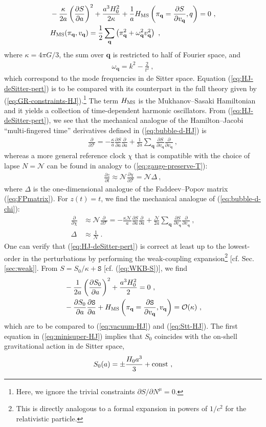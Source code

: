 \documentclass[12pt]{iopart}
\def\eq#1{\begin{equation}\begin{aligned}#1\end{aligned}\end{equation}}
\def\eref#1{(\ref{eq:#1})}
\def\del#1#2{\frac{\partial#1}{\partial#2}}
\def\S{\mathtt{S}}
\def\Ob{\mathcal{O}}
\def\N{\mathcal{N}}
\def\q{\mathbf{q}}
\def\T{\mathcal{T}}
\begin{document}
\eq{\label{eq:HJ-deSitter-pert}
& -\frac{\kappa}{2a}\left(\del{S}{a}\right)^2+\frac{a^3H_0^2}{2\kappa}+\frac{1}{a}H_{\rm MS}\left(\pi_{\q}=\del{S}{v_{\q}},q\right) = 0 \ , \\
&H_{\rm MS}(\pi_{\q},v_{\q}) = \frac12\sum_{\q}\left(\pi_{\q}^2+\omega_{\q}^2v_{\q}^2\right) \ ,
}
where $\kappa = 4\pi G / 3$, the sum over $\q$ is restricted to half of Fourier space, and
\eq{\label{eq:deSitter-freqs}
\omega_{\q} = k^2-\frac{2}{t^2} \ ,
}
which correspond to the mode frequencies in de Sitter space. Equation \eref{HJ-deSitter-pert} is to be compared with its counterpart in the full theory given by \eref{GR-constraints-HJ}.\footnote{Here, we ignore the trivial constraints $\partial S/\partial N^{\mu}=0$.} The term $H_{\rm MS}$ is the Mukhanov--Sasaki Hamiltonian and it yields a collection of time-dependent harmonic oscillators. From \eref{HJ-deSitter-pert}, we see that the mechanical analogue of the Hamilton--Jacobi ``multi-fingered time'' derivatives defined in \eref{bubble-d-HJ} is
\eq{\label{eq:WKB-time-cl}
\del{}{\T} = -\frac{\kappa}{a}\del{S}{a}\del{}{a}+\frac{1}{2a}\sum_{\q}\del{S}{v_{\q}}\del{}{v_{\q}} \ ,
}
whereas a more general reference clock $\chi$ that is compatible with the choice of lapse $N=\N$ can be found in analogy to \eref{gauge-preserve-T}:
\eq{
\del{z}{t} \approx \N\del{\chi}{\T} = \N\Delta \ ,
}
where $\Delta$ is the one-dimensional analogue of the Faddeev--Popov matrix \eref{FPmatrix}. For $z(t) = t$, we find the mechanical analogue of \eref{bubble-d-chi}:
\eq{\label{eq:mechanical-clock}
\del{}{\chi} &\approx \N\del{}{\T} = -\frac{\kappa \N}{a}\del{S}{a}\del{}{a}+\frac{\N}{2a}\sum_{\q}\del{S}{v_{\q}}\del{}{v_{\q}} \ , \\
\Delta &\approx \frac{1}{\N} \ .
}
One can verify that \eref{HJ-deSitter-pert} is correct at least up to the lowest-order in the perturbations by performing the weak-coupling expansion\footnote{This is directly analogous to a formal expansion in powers of $1/c^2$ for the relativistic particle.} [cf. Sec. \ref{sec:weak}]. From $S = S_0/\kappa+\S$ [cf. \eref{WKB-S}], we find
\eq{\label{eq:minisuper-HJ}
&-\frac{1}{2a}\left(\del{S_0}{a}\right)^2+\frac{a^3H_0^2}{2} = 0 \ , \\
&-\del{S_0}{a}\del{\S}{a}+H_{\rm MS}\left(\pi_{\q}=\del{\S}{v_{\q}},v_{\q}\right) = \Ob(\kappa) \ , 
}
which are to be compared to \eref{vacuum-HJ} and \eref{Stt-HJ}. The first equation in \eref{minisuper-HJ} implies that $S_0$ coincides with the on-shell gravitational action in de Sitter space,
\eq{\label{eq:deSitter-action}
S_0(a) = \pm\frac{H_0 a^3}{3} + {\rm const} \ ,
}
\end{document}

